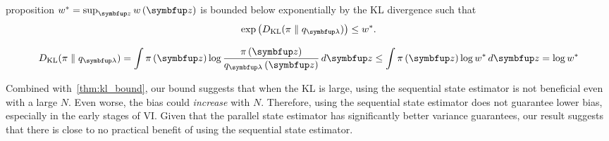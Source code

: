 

\begin{theoremEnd}{proposition}\label{thm:kl_bound}
  \(w^* = \sup_{\vz} w\left(\vz\right) \) is bounded below exponentially by the KL divergence such that
  \[
  \exp\left(\DKL{\pi}{ q_{\vlambda}}\right) \leq w^*.
  \]
\end{theoremEnd}
\vspace{-0.1in}
\begin{proofEnd}
  \begin{align*}
    \DKL{\pi}{ q_{\vlambda} }
    = \int \pi\left(\vz\right) \log \frac{\pi\left(\vz\right)}{q_{\vlambda}\left(\vz\right)}\,d\vz 
    \leq \int \pi\left(\vz\right) \log w^* \, d\vz 
    = \log w^*
  \end{align*}
\end{proofEnd}

Combined with~\cref{thm:kl_bound}, our bound suggests that when the KL is large, using the sequential state estimator is not beneficial even with a large \(N\).
Even worse, the bias could \textit{increase} with \(N\).
Therefore, using the sequential state estimator does not guarantee lower bias, especially in the early stages of VI.
Given that the parallel state estimator has significantly better variance guarantees, our result suggests that there is close to no practical benefit of using the sequential state estimator.



%


